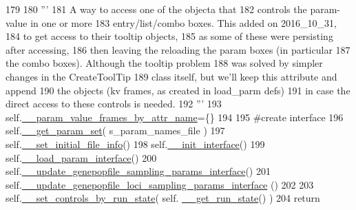 \begin{DoxyCode}
179 
180         \textcolor{stringliteral}{'''}
181 \textcolor{stringliteral}{        A way to access one of the objecta that}
182 \textcolor{stringliteral}{        controls the param-value in one or more }
183 \textcolor{stringliteral}{        entry/list/combo boxes.  This added on 2016\_10\_31, }
184 \textcolor{stringliteral}{        to get access to their tooltip objects,         }
185 \textcolor{stringliteral}{        as some of these were persisting after accessing,}
186 \textcolor{stringliteral}{        then leaving the reloading the param boxes (in particular}
187 \textcolor{stringliteral}{        the combo boxes). Although the tooltip problem}
188 \textcolor{stringliteral}{        was solved by simpler changes in the CreateToolTip}
189 \textcolor{stringliteral}{        class itself, but we'll keep this attribute and append}
190 \textcolor{stringliteral}{        the objects (kv frames, as created in load\_parm defs)}
191 \textcolor{stringliteral}{        in case the direct access to these controls is needed.}
192 \textcolor{stringliteral}{        '''}
193         self.\hyperlink{classnegui_1_1pgguineestimator_1_1PGGuiNeEstimator_a01c0c94da8e029c574ae365c12df4a2e}{\_\_param\_value\_frames\_by\_attr\_name}=\{\}
194 
195         \textcolor{comment}{#create interface}
196         self.\hyperlink{classnegui_1_1pgguineestimator_1_1PGGuiNeEstimator_a7f0670c34b235496b3790e5dd262dfdb}{\_\_get\_param\_set}( s\_param\_names\_file )
197         self.\hyperlink{classnegui_1_1pgguineestimator_1_1PGGuiNeEstimator_af4b45d940b640c10edf9073dd36c74e1}{\_\_set\_initial\_file\_info}()
198         self.\hyperlink{classnegui_1_1pgguineestimator_1_1PGGuiNeEstimator_a9bcfb565358347c231ba954a4ff8a5eb}{\_\_init\_interface}()
199         self.\hyperlink{classnegui_1_1pgguineestimator_1_1PGGuiNeEstimator_a7194ba410abd1cbedf41ca116ca87b3c}{\_\_load\_param\_interface}()
200         self.\hyperlink{classnegui_1_1pgguineestimator_1_1PGGuiNeEstimator_a7be1aa7e8f51033c9e08069f9904e18c}{\_\_update\_genepopfile\_sampling\_params\_interface}()
201         self.\hyperlink{classnegui_1_1pgguineestimator_1_1PGGuiNeEstimator_a205552d4f4155ae058e0f7265de7963f}{\_\_update\_genepopfile\_loci\_sampling\_params\_interface}
      ()
202         
203         self.\hyperlink{classnegui_1_1pgguineestimator_1_1PGGuiNeEstimator_a642c1843660f735af5c340288b87ba77}{\_\_set\_controls\_by\_run\_state}( self.
      \hyperlink{classnegui_1_1pgguineestimator_1_1PGGuiNeEstimator_a364cae23d8c50e52b0fb58d97ff88a80}{\_\_get\_run\_state}() )
204         \textcolor{keywordflow}{return}
\end{DoxyCode}


